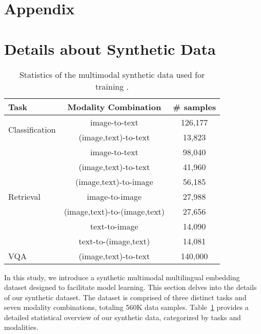 
\clearpage


\section*{Appendix}

\section{Details about Synthetic Data}
\label{appendix: syndata}

\begin{table}[h]
\small
\centering
\begin{tabular}{l|c|c}
\toprule
Task                            & Modality Combination                    & \# samples       \\ \midrule
\multirow{2}{*}{Classification} & image-to-text                &          126,177             \\
                                & (image,text)-to-text         &     13,823                  \\
\midrule
\multirow{7}{*}{Retrieval}      & image-to-text                &   98,040                    \\
                                & (image,text)-to-text         &      41,960                 \\
                                & (image,text)-to-image        &     56,185                  \\
                                & image-to-image               &     27,988                  \\
                                & (image,text)-to-(image,text) &   27,656                    \\
                                & text-to-image                &    14,090                   \\
                                & text-to-(image,text)         &  14,081    \\
\midrule
VQA                             & (image,text)-to-text         & 140,000 \\
\bottomrule
\end{tabular}
\caption{Statistics of the multimodal synthetic data used for training \ours{}.} 
\label{tab:syndata_statistics}
\end{table}

In this study, we introduce a synthetic multimodal multilingual embedding dataset designed to facilitate model learning. 
This section delves into the details of our synthetic dataset. 
The dataset is comprised of three distinct tasks and seven modality combinations, totaling 560K data samples. 
Table~\ref{tab:syndata_statistics} provides a detailed statistical overview of our synthetic data, categorized by tasks and modalities.


